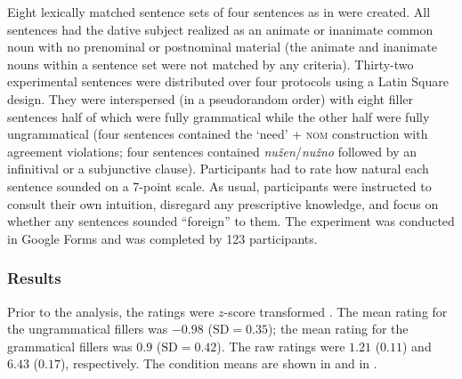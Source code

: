 \documentclass[output=paper,colorlinks,citecolor=brown]{langscibook}
\begin{document}
Eight lexically matched sentence sets of four sentences as in  were created. All sentences had the dative subject realized as an animate or inanimate common noun with no prenominal or postnominal material (the animate and inanimate nouns within a sentence set were not matched by any criteria). Thirty-two experimental sentences were distributed over four protocols using a Latin Square design. They were interspersed (in a pseudorandom order) with eight filler sentences half of which were fully grammatical while the other half were fully ungrammatical (four sentences contained the `need' + \textsc{nom} construction with agreement violations; four sentences contained \textit{nužen}/\textit{nužno} followed by an infinitival or a subjunctive clause). Participants had to rate how natural each sentence sounded on a 7-point scale. As usual, participants were instructed to consult their own intuition, disregard any prescriptive knowledge, and focus on whether any sentences sounded ``foreign'' to them. The experiment was conducted in Google Forms and was completed by 123 participants.

\subsubsection{Results}

Prior to the analysis, the ratings were $z$-score transformed \citep[see][]{Schuetze.Sprouse2014}. The mean rating for the ungrammatical fillers was $-0.98$ ($\text{SD}=0.35$); the mean rating for the grammatical fillers was $0.9$ ($\text{SD} =0.42$). The raw ratings were $1.21$ ($0.11$) and $6.43$ ($0.17$), respectively. The condition means are shown in  and in .

\end{document}

